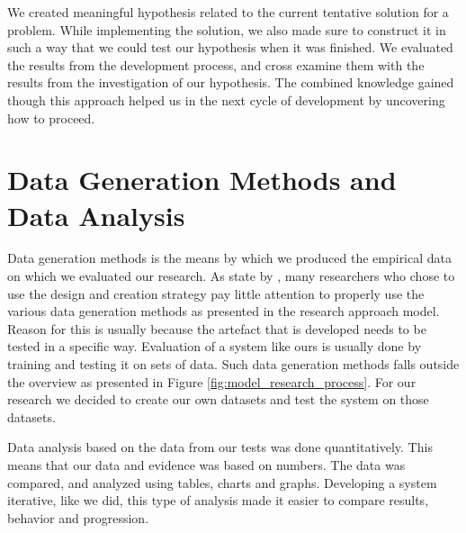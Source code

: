 We created meaningful hypothesis related to the current tentative solution for a problem. While implementing the solution, we also made sure to construct it in such a way that we could test our hypothesis when it was finished. We evaluated the results from the development process, and cross examine them with the results from the investigation of our hypothesis. The combined knowledge gained though this approach helped us in the next cycle of development by uncovering how to proceed.


\section{Data Generation Methods and Data Analysis}
\label{sec:data_generation_methods_and_data_analysis}
Data generation methods is the means by which we produced the empirical data on which we evaluated our research. As state by \citep{oates2005researching}, many researchers who chose to use the design and creation strategy pay little attention to properly use the various data generation methods as presented in the research approach model. Reason for this is usually because the artefact that is developed needs to be tested in a specific way. Evaluation of a system like ours is usually done by training and testing it on sets of data. Such data generation methods falls outside the overview as presented in Figure \ref{fig:model_research_process}. For our research we decided to create our own datasets and test the system on those datasets.

Data analysis based on the data from our tests was done quantitatively. This means that our data and evidence was based on numbers. The data was compared, and analyzed using tables, charts and graphs. Developing a system iterative, like we did, this type of analysis made it easier to compare results, behavior and progression.